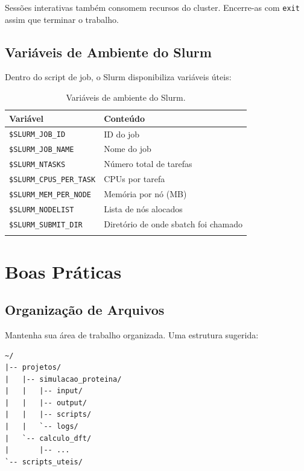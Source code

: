 \documentclass[11pt, a4paper]{article}
\newcommand{\cmd}[1]{\texttt{\textcolor{codeblue}{#1}}}
\begin{document}
\begin{atencao}
  Sessões interativas também consomem recursos do cluster. Encerre-as
  com \cmd{exit} assim que terminar o trabalho.
\end{atencao}

\subsection{Variáveis de Ambiente do Slurm}

Dentro do script de job, o Slurm disponibiliza variáveis úteis:

\begin{longtable}{ll}
  \toprule
  \textbf{Variável} & \textbf{Conteúdo} \\
  \midrule
  \endhead
  \texttt{\$SLURM\_JOB\_ID} & ID do job \\
  \texttt{\$SLURM\_JOB\_NAME} & Nome do job \\
  \texttt{\$SLURM\_NTASKS} & Número total de tarefas \\
  \texttt{\$SLURM\_CPUS\_PER\_TASK} & CPUs por tarefa \\
  \texttt{\$SLURM\_MEM\_PER\_NODE} & Memória por nó (MB) \\
  \texttt{\$SLURM\_NODELIST} & Lista de nós alocados \\
  \texttt{\$SLURM\_SUBMIT\_DIR} & Diretório de onde sbatch foi chamado \\
  \bottomrule
  \caption{Variáveis de ambiente do Slurm.}
\end{longtable}

\section{Boas Práticas}

\subsection{Organização de Arquivos}

Mantenha sua área de trabalho organizada. Uma estrutura sugerida:

\begin{lstlisting}[style=terminal]
~/
|-- projetos/
|   |-- simulacao_proteina/
|   |   |-- input/
|   |   |-- output/
|   |   |-- scripts/
|   |   `-- logs/
|   `-- calculo_dft/
|       |-- ...
`-- scripts_uteis/
\end{lstlisting}
\end{document}
